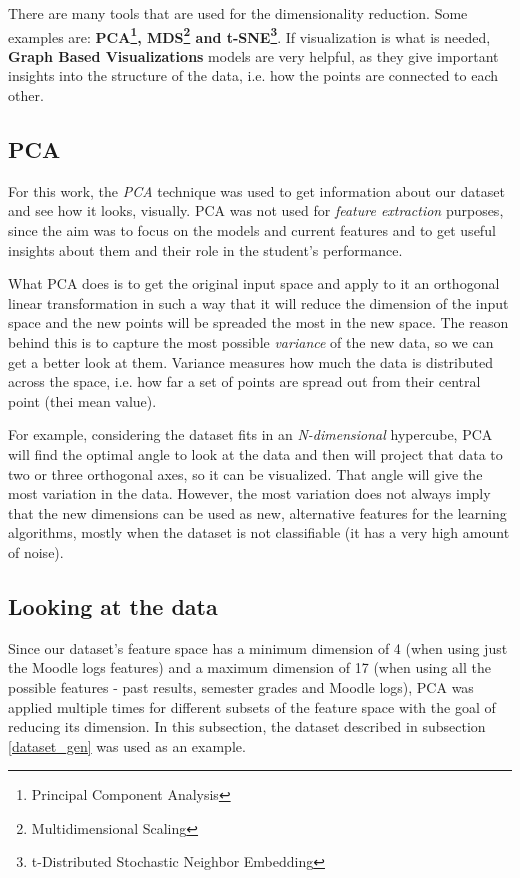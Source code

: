 There are many tools that are used for the dimensionality reduction. Some 
examples are: {\bf PCA\footnote{Principal Component Analysis}, MDS\footnote
{Multidimensional Scaling} and t-SNE\footnote{t-Distributed Stochastic Neighbor 
Embedding}}. If visualization is what is needed, {\bf Graph Based Visualizations} 
models are very helpful, as they give important insights into the structure 
of the data, i.e. how the points are connected to each other.

\subsection{PCA}

For this work, the {\it PCA} technique was used to get information about our 
dataset and see how it looks, visually. PCA was not used for {\it feature 
extraction} purposes, since the aim was to focus on the models and current 
features and to get useful insights about them and their role in the student's 
performance. 

What PCA does is to get the original input space and apply to it an orthogonal 
linear transformation in such a way that it will reduce the dimension of the 
input space and the new points will be spreaded the most in the new space. 
The reason behind this is to capture the most possible {\it variance} of the 
new data, so we can get a better look at them. Variance measures how much 
the data is distributed across the space, i.e. how far a set of points are 
spread out from their central point (thei mean value).

For example, considering the dataset fits in an {\it N-dimensional} hypercube, 
PCA will find the optimal angle to look at the data and then will project that data 
to two or three orthogonal axes, so it can be visualized. That angle will 
give the most variation in the data. However, the most variation does not 
always imply that the new dimensions can be used as new, alternative features 
for the learning algorithms, mostly when the dataset is not classifiable (it 
has a very high amount of noise).

\subsection{Looking at the data}

Since our dataset's feature space has a minimum dimension of 4 (when 
using just the Moodle logs features) and a maximum dimension of 17 (when 
using all the possible features - past results, semester grades and 
Moodle logs), PCA was applied multiple times for different subsets of the 
feature space with the goal of reducing its dimension. In this subsection, 
the dataset described in subsection \ref{dataset_gen} was used as an example. 


